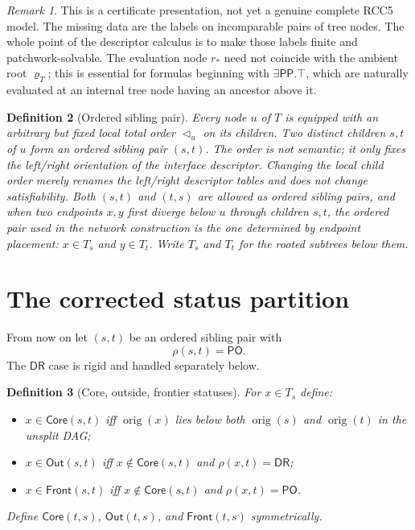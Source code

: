 \documentclass[11pt]{article}
\newtheorem{definition}{Definition}[section]
\theoremstyle{remark}
\newtheorem{remark}[definition]{Remark}
\newcommand{\DR}{\mathsf{DR}}
\newcommand{\PO}{\mathsf{PO}}
\newcommand{\PP}{\mathsf{PP}}
\newcommand{\orig}{\operatorname{orig}}
\newcommand{\Core}{\mathsf{Core}}
\newcommand{\Out}{\mathsf{Out}}
\newcommand{\Front}{\mathsf{Front}}
\begin{document}
\begin{remark}
This is a certificate presentation, not yet a genuine complete RCC5 model. The missing data are the labels on incomparable pairs of tree nodes. The whole point of the descriptor calculus is to make those labels finite and patchwork-solvable. The evaluation node $r_\ast$ need not coincide with the ambient root $\varrho_T$; this is essential for formulas beginning with $\exists\PP.\top$, which are naturally evaluated at an internal tree node having an ancestor above it.
\end{remark}

\begin{definition}[Ordered sibling pair]\label{def:ordered-siblings}
Every node $u$ of $T$ is equipped with an arbitrary but fixed local total order $\triangleleft_u$ on its children. Two distinct children $s,t$ of $u$ form an \emph{ordered sibling pair} $(s,t)$. The order is not semantic; it only fixes the left/right orientation of the interface descriptor. Changing the local child order merely renames the left/right descriptor tables and does not change satisfiability. Both $(s,t)$ and $(t,s)$ are allowed as ordered sibling pairs, and when two endpoints $x,y$ first diverge below $u$ through children $s,t$, the ordered pair used in the network construction is the one determined by endpoint placement: $x\in T_s$ and $y\in T_t$. Write $T_s$ and $T_t$ for the rooted subtrees below them.
\end{definition}

\section{The corrected status partition}

From now on let $(s,t)$ be an ordered sibling pair with
\[
\rho(s,t)=\PO.
\]
The $\DR$ case is rigid and handled separately below.

\begin{definition}[Core, outside, frontier statuses]\label{def:statuses-completed}
For $x\in T_s$ define:
\begin{itemize}
    \item $x\in \Core(s,t)$ iff $\orig(x)$ lies below both $\orig(s)$ and $\orig(t)$ in the unsplit DAG;
    \item $x\in \Out(s,t)$ iff $x\notin \Core(s,t)$ and $\rho(x,t)=\DR$;
    \item $x\in \Front(s,t)$ iff $x\notin \Core(s,t)$ and $\rho(x,t)=\PO$.
\end{itemize}
Define $\Core(t,s)$, $\Out(t,s)$, and $\Front(t,s)$ symmetrically.
\end{definition}
\end{document}
